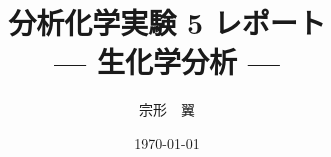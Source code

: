 \usepackage{color}
\usepackage{comment}
\usepackage[bottom=25mm]{geometry} %
\usepackage{lastpage} %
\usepackage{fancyhdr} %
\usepackage{titlesec} %
\usepackage[unicode]{hyperref} %
\usepackage{docmute}

\usepackage{amsfonts} %
\usepackage{bm}       %
\usepackage{braket}   %

\usepackage[version=4]{mhchem}   %
\usepackage{chemfig}  %
\usepackage{siunitx}  %
\usepackage{listing}  %

\makeatletter

\titleformat{\part}{\centering\Large}{}{0em}{}
\titlespacing{\part}{0pt}{0ex}{1cm}
\newcommand{\repotitle}[1]{\def\@repotitle{#1}}
\newcommand{\gakuseinumber}[1]{\def\@gakuseinumber{#1}}
\renewcommand{\maketitle}{
    \thispagestyle{empty}
    \pagenumbering{gobble}
    \vspace*{\stretch{1}}
    \begin{center}
        \vspace*{0.4cm}
        {\Huge{\@title}}
        \vspace{1cm}

        {\Large \@date}

        \vspace{0.5cm}

        {\Large \@gakuseinumber \quad \@author}

        \vspace{1cm}
    \end{center}
    \vspace{\stretch{1}}
    \newpage
    \pagenumbering{arabic}
}


\pagestyle{fancy}
\lhead{\@repotitle \qquad \@gakuseinumber \quad \@author}
\fancyfoot{}
\makeatother

\newcommand{\uL}[0]{\si{\micro L}}
\newcommand{\ug}[0]{\si{\micro g}}

\repotitle{分析化学実験 5 レポート}
\title{分析化学実験 5 レポート \\ \vspace{1.5ex} {\LARGE --- 生化学分析 ---}}
\author{宗形　翼}
\gakuseinumber{03-200796}
\date{\today}

